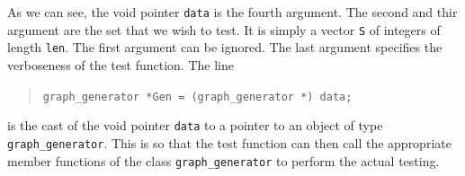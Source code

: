 As we can see, the void pointer \verb'data' is the fourth argument. 
The second and thir argument are the set that we wish to test. 
It is simply a vector \verb'S' of integers of length \verb'len'.
The first argument can be ignored. The last argument specifies the 
verboseness of the test function. 
The line 
\begin{quote}
\verb'graph_generator *Gen = (graph_generator *) data;'\\
\end{quote}
is the cast of the void pointer \verb'data' to a pointer to an object 
of type \verb'graph_generator'.
This is so that the test function can then call the appropriate member functions 
of the class \verb'graph_generator' to perform the actual testing.

